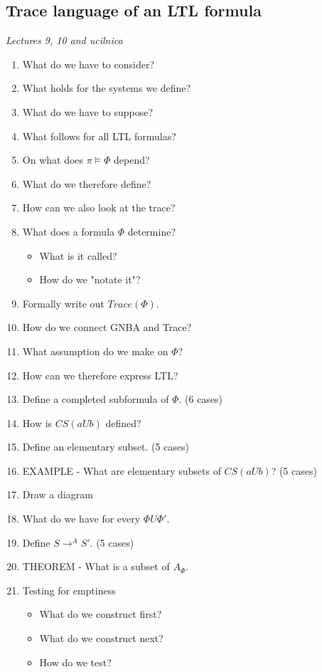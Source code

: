 \documentclass[fleqn]{article}
\begin{document}
\subsection{Trace language of an LTL formula}
\textit{Lectures 9, 10 and ucilnica}
\begin{enumerate}
    \item What do we have to consider?
    \item What holds for the systems we define?
    \item What do we have to suppose?
    \item What follows for all LTL formulas?
    \item On what does $\pi \models \Phi$ depend?
    \item What do we therefore define?
    \item How can we also look at the trace?
    \item What does a formula $\Phi$ determine?
    \begin{itemize}
        \item What is it called?
        \item How do we "notate it"?
    \end{itemize}
    \item Formally write out $Trace(\Phi)$.
    \item How do we connect GNBA and Trace?
    \item What assumption do we make on $\Phi$?
    \item How can we therefore express LTL?
    \item Define a completed subformula of $\Phi$. (6 cases)
    \item How is $CS(a U b) $ defined?
    \item Define an elementary subset. (5 cases)
    \item EXAMPLE - What are elementary subsets of $CS(a U b)$? (5 cases)
    \item Draw a diagram
    \item What do we have for every $\Phi U \Phi'$.
    \item Define $S \rightarrow^{A} S'$. (5 cases)
    \item THEOREM - What is a subset of $A_{\Phi}$.
    \item Testing for emptiness
    \begin{itemize}
        \item What do we construct first?
        \item What do we construct next?
        \item How do we test?
    \end{itemize}
\end{enumerate}
\end{document}

